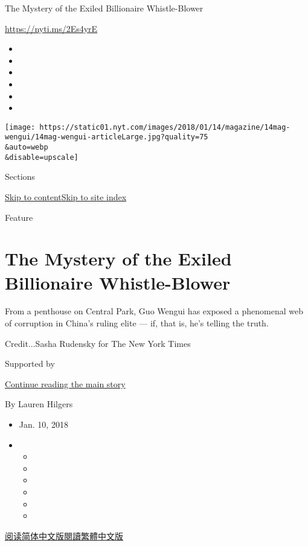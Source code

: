 The Mystery of the Exiled Billionaire Whistle-Blower

\url{https://nyti.ms/2Es4yrE}

\begin{itemize}
\item
\item
\item
\item
\item
\item
\end{itemize}

\texttt{[image: https://static01.nyt.com/images/2018/01/14/magazine/14mag-wengui/14mag-wengui-articleLarge.jpg?quality=75\\\&auto=webp\\\&disable=upscale]}

Sections

\protect\hyperlink{site-content}{Skip to
content}\protect\hyperlink{site-index}{Skip to site index}

Feature

\hypertarget{the-mystery-of-the-exiled-billionaire-whistle-blower}{%
\section{The Mystery of the Exiled Billionaire
Whistle-Blower}\label{the-mystery-of-the-exiled-billionaire-whistle-blower}}

From a penthouse on Central Park, Guo Wengui has exposed a phenomenal
web of corruption in China's ruling elite --- if, that is, he's telling
the truth.

Credit...Sasha Rudensky for The New York Times

Supported by

\protect\hyperlink{after-sponsor}{Continue reading the main story}

By Lauren Hilgers

\begin{itemize}
\item
  Jan. 10, 2018
\item
  \begin{itemize}
  \item
  \item
  \item
  \item
  \item
  \item
  \end{itemize}
\end{itemize}

\href{https://cn.nytimes.com/china/20180110/the-world-according-to-guo/}{阅读简体中文版}\href{https://cn.nytimes.com/china/20180110/the-world-according-to-guo/zh-hant/}{閱讀繁體中文版}

